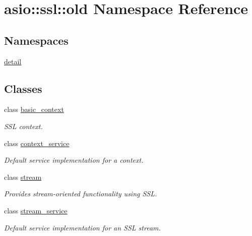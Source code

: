 \hypertarget{namespaceasio_1_1ssl_1_1old}{}\section{asio\+:\+:ssl\+:\+:old Namespace Reference}
\label{namespaceasio_1_1ssl_1_1old}
\subsection*{Namespaces}
\begin{DoxyCompactItemize}
\item 
 \hyperlink{namespaceasio_1_1ssl_1_1old_1_1detail}{detail}
\end{DoxyCompactItemize}
\subsection*{Classes}
\begin{DoxyCompactItemize}
\item 
class \hyperlink{classasio_1_1ssl_1_1old_1_1basic__context}{basic\+\_\+context}
\begin{DoxyCompactList}\small\item\em S\+S\+L context. \end{DoxyCompactList}\item 
class \hyperlink{classasio_1_1ssl_1_1old_1_1context__service}{context\+\_\+service}
\begin{DoxyCompactList}\small\item\em Default service implementation for a context. \end{DoxyCompactList}\item 
class \hyperlink{classasio_1_1ssl_1_1old_1_1stream}{stream}
\begin{DoxyCompactList}\small\item\em Provides stream-\/oriented functionality using S\+S\+L. \end{DoxyCompactList}\item 
class \hyperlink{classasio_1_1ssl_1_1old_1_1stream__service}{stream\+\_\+service}
\begin{DoxyCompactList}\small\item\em Default service implementation for an S\+S\+L stream. \end{DoxyCompactList}\end{DoxyCompactItemize}
